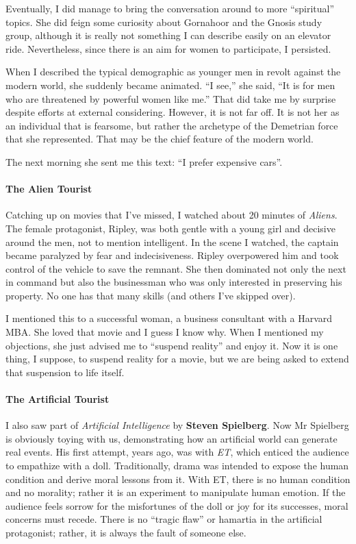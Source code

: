 Eventually, I did manage to bring the conversation around to more ``spiritual'' topics. She did feign some curiosity about Gornahoor and the Gnosis study group, although it is really not something I can describe easily on an elevator ride. Nevertheless, since there is an aim for women to participate, I persisted.

When I described the typical demographic as younger men in revolt against the modern world, she suddenly became animated. ``I see,'' she said, ``It is for men who are threatened by powerful women like me.'' That did take me by surprise despite efforts at external considering. However, it is not far off. It is not her as an individual that is fearsome, but rather the archetype of the Demetrian force that she represented. That may be the chief feature of the modern world.

The next morning she sent me this text: ``I prefer expensive cars''.

\paragraph{The Alien Tourist}


Catching up on movies that I've missed, I watched about 20 minutes of \emph{Aliens}. The female protagonist, Ripley, was both gentle with a young girl and decisive around the men, not to mention intelligent. In the scene I watched, the captain became paralyzed by fear and indecisiveness. Ripley overpowered him and took control of the vehicle to save the remnant. She then dominated not only the next in command but also the businessman who was only interested in preserving his property. No one has that many skills (and others I've skipped over).

I mentioned this to a successful woman, a business consultant with a Harvard MBA. She loved that movie and I guess I know why. When I mentioned my objections, she just advised me to ``suspend reality'' and enjoy it. Now it is one thing, I suppose, to suspend reality for a movie, but we are being asked to extend that suspension to life itself.

\paragraph{The Artificial Tourist}


I also saw part of \emph{Artificial Intelligence} by \textbf{Steven Spielberg}. Now Mr Spielberg is obviously toying with us, demonstrating how an artificial world can generate real events. His first attempt, years ago, was with \emph{ET}, which enticed the audience to empathize with a doll. Traditionally, drama was intended to expose the human condition and derive moral lessons from it. With ET, there is no human condition and no morality; rather it is an experiment to manipulate human emotion. If the audience feels sorrow for the misfortunes of the doll or joy for its successes, moral concerns must recede. There is no ``tragic flaw'' or hamartia in the artificial protagonist; rather, it is always the fault of someone else.


